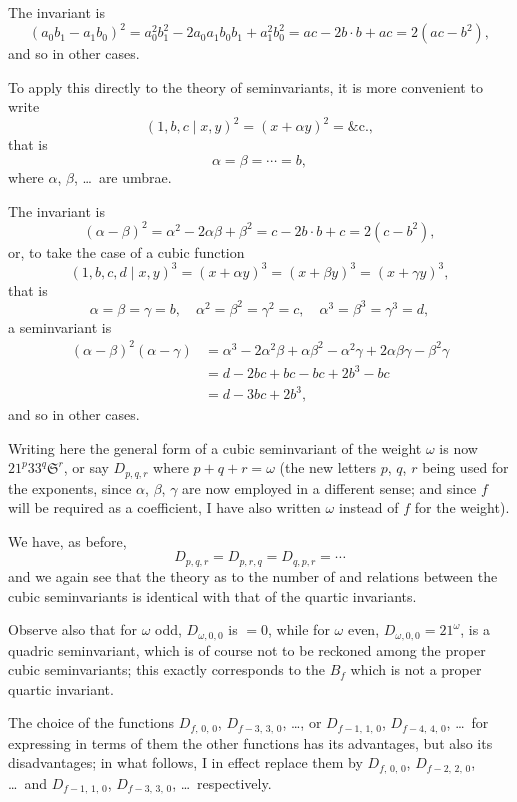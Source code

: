 \documentclass[11pt,a4paper]{article}
\theoremstyle{definition}
\begin{document}
The invariant is
\[
(a_0b_1 - a_1b_0)^2 = a_0^2b_1^2 - 2a_0a_1b_0b_1 + a_1^2b_0^2 = ac - 2b \cdot b + ac = 2(ac - b^2),
\]
and so in other cases.

To apply this directly to the theory of seminvariants, it is more convenient to write
\[
(1, b, c \mid x, y)^2 = (x + \alpha y)^2 = \text{\&c.},
\]
that is
\[
\alpha = \beta = \cdots = b,
\]
where $\alpha$, $\beta$, \ldots\ are umbrae.

The invariant is
\[
(\alpha - \beta)^2 = \alpha^2 - 2\alpha\beta + \beta^2 = c - 2b \cdot b + c = 2(c - b^2),
\]
or, to take the case of a cubic function
\[
(1, b, c, d \mid x, y)^3 = (x + \alpha y)^3 = (x + \beta y)^3 = (x + \gamma y)^3,
\]
that is
\[
\alpha = \beta = \gamma = b, \quad \alpha^2 = \beta^2 = \gamma^2 = c, \quad \alpha^3 = \beta^3 = \gamma^3 = d,
\]
a seminvariant is
\begin{align*}
(\alpha - \beta)^2(\alpha - \gamma) &= \alpha^3 - 2\alpha^2\beta + \alpha\beta^2 - \alpha^2\gamma + 2\alpha\beta\gamma - \beta^2\gamma\\
&= d - 2bc + bc - bc + 2b^3 - bc\\
&= d - 3bc + 2b^3,
\end{align*}
and so in other cases.

Writing here the general form of a cubic seminvariant of the weight $\omega$ is now $21^p 33^q \mathfrak{S}^r$, or say $D_{p,q,r}$ where $p + q + r = \omega$ (the new letters $p$, $q$, $r$ being used for the exponents, since $\alpha$, $\beta$, $\gamma$ are now employed in a different sense; and since $f$ will be required as a coefficient, I have also written $\omega$ instead of $f$ for the weight).

We have, as before,
\[
D_{p,q,r} = D_{p,r,q} = D_{q,p,r} = \cdots
\]
and we again see that the theory as to the number of and relations between the cubic seminvariants is identical with that of the quartic invariants.

Observe also that for $\omega$ odd, $D_{\omega,0,0}$ is $= 0$, while for $\omega$ even, $D_{\omega,0,0} = 21^{\omega}$, is a quadric seminvariant, which is of course not to be reckoned among the proper cubic seminvariants; this exactly corresponds to the $B_f$ which is not a proper quartic invariant.

The choice of the functions $D_{f,\,0,\,0}$, $D_{f-3,\,3,\,0}$, \ldots, or $D_{f-1,\,1,\,0}$, $D_{f-4,\,4,\,0}$, \ldots\ for expressing in terms of them the other functions has its advantages, but also its disadvantages; in what follows, I in effect replace them by $D_{f,\,0,\,0}$, $D_{f-2,\,2,\,0}$, \ldots\ and $D_{f-1,\,1,\,0}$, $D_{f-3,\,3,\,0}$, \ldots\ respectively.
\end{document}
